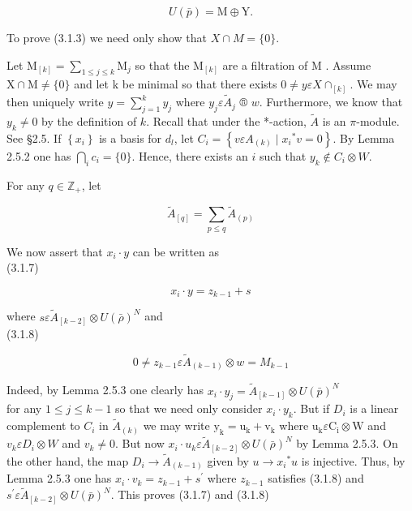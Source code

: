 \documentclass[10pt]{article}
\begin{document}
\begin{equation*}
U(\bar{p})=\mathrm{M} \oplus \mathrm{Y} . \tag{3.1.5}
\end{equation*}


To prove (3.1.3) we need only show that $X \cap M=\{0\}$.

Let $\mathrm{M}_{[k]}=\sum_{1 \leq j \leq k} \mathrm{M}_{j}$ so that the $\mathrm{M}_{[k]}$ are a filtration of M . Assume $\mathrm{X} \cap \mathrm{M} \neq\{0\}$ and let k be minimal so that there exists $0 \neq y \varepsilon X \cap_{[k]}$. We may then uniquely write $y=\sum_{j=1}^{k} y_{j}$ where $y_{j} \varepsilon \tilde{A}_{j}$ ® $w$. Furthermore, we know that $y_{k} \neq 0$ by the definition of $k$. Recall that under the *-action, $\tilde{A}$ is an $\pi$-module. See §2.5. If $\left\{x_{i}\right\}$ is a basis for $d_{l}$, let $C_{i}=\left\{v \varepsilon A_{(k)} \mid x_{i}{ }^{*} v=0\right\}$. By Lemma 2.5.2 one has $\bigcap_{i} c_{i}=\{0\}$. Hence, there exists an $i$ such that $y_{k} \notin C_{i} \otimes W$.

For any $q \in \mathbb{Z}_{+}$, let


\begin{equation*}
\tilde{A}_{[q]}=\sum_{p \leq q} \tilde{A}_{(p)} \tag{3.1.7}
\end{equation*}


We now assert that $x_{i} \cdot y$ can be written as\\
(3.1.7)

$$
x_{i} \cdot y=z_{k-1}+s
$$

where $s \varepsilon \tilde{A}_{[k-2]} \otimes U(\bar{\rho})^{N}$ and\\
(3.1.8)

$$
0 \neq z_{k-1} \varepsilon \tilde{A}_{(k-1)} \otimes w=M_{k-1}
$$

Indeed, by Lemma 2.5.3 one clearly has $x_{i} \cdot y_{j}=\tilde{A}_{[k-1]} \otimes U(\bar{p})^{N}$\\
for any $1 \leq j \leq k-1$ so that we need only consider $x_{i} \cdot y_{k}$. But if $D_{i}$ is a linear complement to $C_{i}$ in $\tilde{A}_{(k)}$ we may write $\mathrm{y}_{\mathrm{k}}=\mathrm{u}_{\mathrm{k}}+\mathrm{v}_{\mathrm{k}}$ where $\mathrm{u}_{\mathrm{k}} \varepsilon \mathrm{C}_{\mathrm{i}} \otimes \mathrm{W}$ and $v_{k} \varepsilon D_{i} \otimes W$ and $v_{k} \neq 0$. But now $x_{i} \cdot u_{k} \varepsilon \tilde{A}_{[k-2]} \otimes U(\bar{\rho})^{N}$ by Lemma 2.5.3. On the other hand, the map $D_{i} \rightarrow \tilde{A}_{(k-1)}$ given by $u \rightarrow x_{i}{ }^{*} u$ is injective. Thus, by Lemma 2.5.3 one has $x_{i} \cdot v_{k}=z_{k-1}+s^{\prime}$ where $z_{k-1}$ satisfies (3.1.8) and $s^{\prime} \varepsilon \tilde{A}_{[k-2]} \otimes U(\bar{p})^{N}$. This proves (3.1.7) and (3.1.8)
\end{document}
